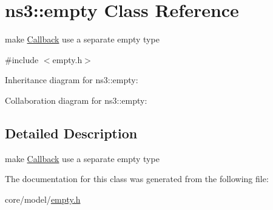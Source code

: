 \hypertarget{classns3_1_1empty}{}\section{ns3\+:\+:empty Class Reference}
\label{classns3_1_1empty}


make \hyperlink{classns3_1_1Callback}{Callback} use a separate empty type  




{\ttfamily \#include $<$empty.\+h$>$}



Inheritance diagram for ns3\+:\+:empty\+:


Collaboration diagram for ns3\+:\+:empty\+:


\subsection{Detailed Description}
make \hyperlink{classns3_1_1Callback}{Callback} use a separate empty type 

The documentation for this class was generated from the following file\+:\begin{DoxyCompactItemize}
\item 
core/model/\hyperlink{empty_8h}{empty.\+h}\end{DoxyCompactItemize}
